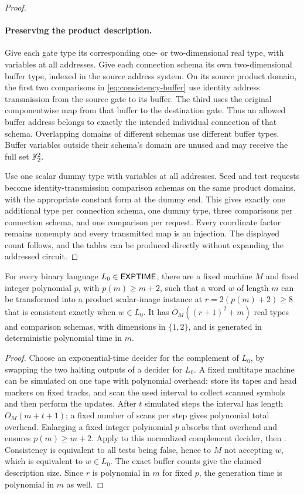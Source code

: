 \begin{proof}
\paragraph{Preserving the product description.}
Give each gate type its corresponding one- or two-dimensional real type,
with variables at all addresses. Give each connection schema its own
two-dimensional buffer type, indexed in the source address system. On its
source product domain, the first two comparisons in
\eqref{eq:consistency-buffer} use identity address transmission from the
source gate to its buffer. The third uses the original componentwise map
from that buffer to the destination gate. Thus an allowed buffer address
belongs to exactly the intended individual connection of that schema.
Overlapping domains of different schemas use different buffer types.
Buffer variables outside their schema's domain are unused and may receive
the full set $\mathbb F_2^2$.

Use one scalar dummy type with variables at all addresses. Seed and test
requests become identity-transmission comparison schemas on the same
product domains, with the appropriate constant form at the dummy end.
This gives exactly one additional type per connection schema, one dummy
type, three comparisons per connection schema, and one comparison per
request. Every coordinate factor remains nonempty and every transmitted
map is an injection. The displayed count follows, and the tables can be
produced directly without expanding the addressed circuit.
\end{proof}

\begin{corollary}\label{prop:computation-images}
For every binary language \(L_0\in\mathsf{EXPTIME}\), there are a fixed machine
\(M\) and fixed integer polynomial \(p\), with \(p(m)\ge m+2\), such that
a word \(w\) of length \(m\) can be transformed into a product
scalar-image instance at \(r=2(p(m)+2)\ge8\) that is consistent exactly
when \(w\in L_0\). It has \(O_M((r+1)^2+m)\) real types and
comparison schemas, with dimensions in \(\{1,2\}\), and is generated
in deterministic polynomial time in \(m\).
\end{corollary}
\begin{proof}
Choose an exponential-time decider for the complement of \(L_0\),
by swapping the two halting outputs of a decider for \(L_0\).
A fixed multitape machine can be simulated on one tape with polynomial
overhead: store its tapes and head markers on fixed tracks, and scan the
used interval to collect scanned symbols and then perform the updates.
After \(t\) simulated steps the interval has length \(O_M(m+t+1)\);
a fixed number of scans per step gives polynomial total overhead.
Enlarging a fixed integer polynomial \(p\) absorbs that overhead and
ensures \(p(m)\ge m+2\). Apply  to this normalized
complement decider, then . Consistency is equivalent
to all tests being false, hence to \(M\) not accepting \(w\), which is
equivalent to \(w\in L_0\). The exact buffer counts give the claimed
description size. Since \(r\) is polynomial in \(m\) for fixed \(p\),
the generation time is polynomial in \(m\) as well.
\end{proof}
